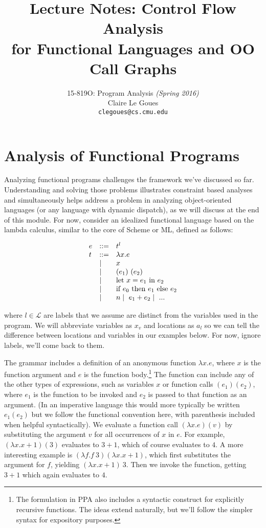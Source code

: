 \documentclass[11pt]{article}
\title{Lecture Notes: 
		Control Flow Analysis \\ for Functional Languages and OO Call Graphs}
\author{15-819O: Program Analysis \emph{(Spring 2016)} \\
        Claire Le Goues \\
		{\tt clegoues@cs.cmu.edu}}
\date{}
\begin{document}
\newtheorem{theorem}{Theorem}
\newtheorem{lemma}[theorem]{Lemma}

\maketitle

\section{Analysis of Functional Programs}

Analyzing functional programs challenges the framework we've discussed so far. Understanding and solving those problems illustrates constraint based analyses and simultaneously helps address a problem in analyzing object-oriented languages (or any language with dynamic dispatch), as we will discuss at the end of this module.  For now, consider an idealized functional language based on the lambda calculus, similar to the core of Scheme or ML, defined as follows:

\[
\begin{array}{lllll}
e & ::= & t^l \\
t & ::= & \lambda x . e \\
  & \mathrel{\mid} & x \\
  & \mathrel{\mid} & (e_1) ~ (e_2) \\
  & \mathrel{\mid} & \mbox{let}~x = e_1~\mbox{in}~e_2 \\
  & \mathrel{\mid} & \mbox{if}~e_0~\mbox{then}~e_1~\mbox{else}~e_2 \\
  & \mathrel{\mid} & n \mathrel{\mid}~e_1 + e_2 \mathrel{\mid}~ ... \\
\end{array}
\]

\noindent where $l \in \mathcal{L}$ are labels that we assume are distinct from the variables used in the program.  We will abbreviate variables as $x_v$ and locations as $a_l$ so we can tell the difference between locations and variables in our examples below.  For now, ignore labels, we'll come back to them.  

The grammar includes a definition of an anonymous function $\lambda x . e$, where $x$ is the function argument and $e$ is the function body.\footnote{The formulation in PPA also includes a syntactic construct for explicitly recursive functions.  The ideas extend naturally, but we'll follow the simpler syntax for expository purposes.}  The function can include any of the other types of expressions, such as variables $x$ or function calls $(e_1) (e_2)$, where $e_1$ is the function to be invoked and $e_2$ is passed to that function as an argument.  (In an imperative language this would more typically be written $e_1(e_2)$ but we follow the functional convention here, with parenthesis included when helpful syntactically).  We evaluate a function call $(\lambda x . e)(v)$ by substituting the argument $v$ for all occurrences of $x$ in $e$.  For example, $(\lambda x . x + 1)(3)$ evaluates to $3 + 1$, which of course evaluates  to $4$.
%
A more interesting example is $(\lambda f . f ~ 3) (\lambda x . x + 1)$, which first substitutes the argument for $f$, yielding $(\lambda x . x + 1) ~ 3$.  Then we invoke the function, getting $3+1$ which again evaluates to $4$.
\end{document}
